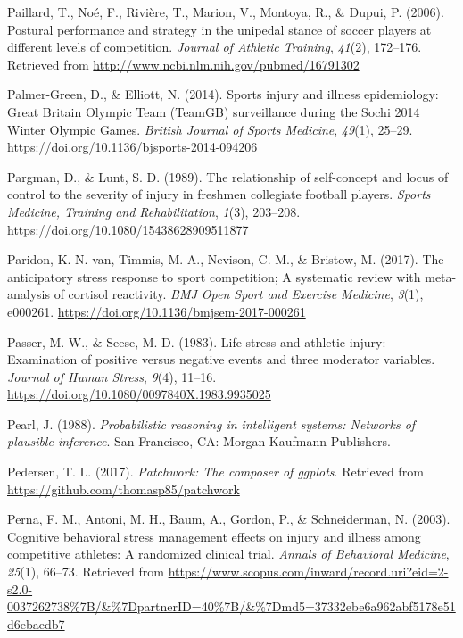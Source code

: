 \documentclass[man,floatsintext]{apa6}
\begin{document}
\leavevmode\hypertarget{ref-Paillard2006}{}%
Paillard, T., Noé, F., Rivière, T., Marion, V., Montoya, R., \& Dupui, P. (2006). Postural performance and strategy in the unipedal stance of soccer players at different levels of competition. \emph{Journal of Athletic Training}, \emph{41}(2), 172--176. Retrieved from \url{http://www.ncbi.nlm.nih.gov/pubmed/16791302}

\leavevmode\hypertarget{ref-Palmer-Green2014}{}%
Palmer-Green, D., \& Elliott, N. (2014). Sports injury and illness epidemiology: Great Britain Olympic Team (TeamGB) surveillance during the Sochi 2014 Winter Olympic Games. \emph{British Journal of Sports Medicine}, \emph{49}(1), 25--29. \url{https://doi.org/10.1136/bjsports-2014-094206}

\leavevmode\hypertarget{ref-Pargman1989}{}%
Pargman, D., \& Lunt, S. D. (1989). The relationship of self-concept and locus of control to the severity of injury in freshmen collegiate football players. \emph{Sports Medicine, Training and Rehabilitation}, \emph{1}(3), 203--208. \url{https://doi.org/10.1080/15438628909511877}

\leavevmode\hypertarget{ref-VanParidon2017}{}%
Paridon, K. N. van, Timmis, M. A., Nevison, C. M., \& Bristow, M. (2017). The anticipatory stress response to sport competition; A systematic review with meta-analysis of cortisol reactivity. \emph{BMJ Open Sport and Exercise Medicine}, \emph{3}(1), e000261. \url{https://doi.org/10.1136/bmjsem-2017-000261}

\leavevmode\hypertarget{ref-Passer1983a}{}%
Passer, M. W., \& Seese, M. D. (1983). Life stress and athletic injury: Examination of positive versus negative events and three moderator variables. \emph{Journal of Human Stress}, \emph{9}(4), 11--16. \url{https://doi.org/10.1080/0097840X.1983.9935025}

\leavevmode\hypertarget{ref-Pearl1988}{}%
Pearl, J. (1988). \emph{Probabilistic reasoning in intelligent systems: Networks of plausible inference}. San Francisco, CA: Morgan Kaufmann Publishers.

\leavevmode\hypertarget{ref-R-patchwork}{}%
Pedersen, T. L. (2017). \emph{Patchwork: The composer of ggplots}. Retrieved from \url{https://github.com/thomasp85/patchwork}

\leavevmode\hypertarget{ref-Perna2003}{}%
Perna, F. M., Antoni, M. H., Baum, A., Gordon, P., \& Schneiderman, N. (2003). Cognitive behavioral stress management effects on injury and illness among competitive athletes: A randomized clinical trial. \emph{Annals of Behavioral Medicine}, \emph{25}(1), 66--73. Retrieved from \url{https://www.scopus.com/inward/record.uri?eid=2-s2.0-0037262738\%7B/\&\%7DpartnerID=40\%7B/\&\%7Dmd5=37332ebe6a962abf5178e51d6ebaedb7}
\end{document}

